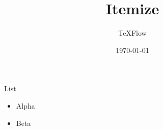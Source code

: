 \documentclass[aspectratio=43]{beamer}
\title{Itemize}
\author{TeXFlow}
\date{\today}
\begin{document}
\begin{frame}{List}
\begin{itemize}
  \item Alpha
  \item Beta
\end{itemize}
\end{frame}
\end{document}
